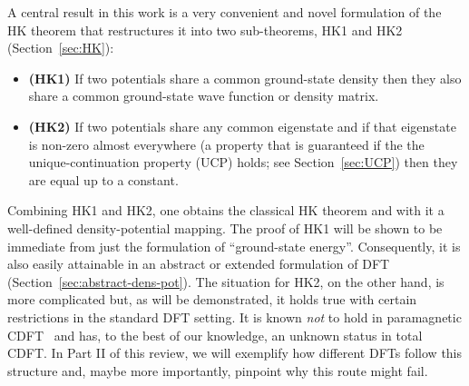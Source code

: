 \documentclass[journal=apcach,manuscript=article,layout=twocolumn]{achemso}
\newcommand{\changed}[1] {{ {#1}}} %
\begin{document}
A central result in this work is a very convenient and novel formulation of the \changed{HK} theorem that restructures it into two sub-theorems, HK1 and HK2 (Section~\ref{sec:HK}):
%
\begin{itemize}
\item \textbf{(HK1)} If two potentials share a common ground-state density then they also share a common ground-state wave function or density matrix.
\item \textbf{(HK2)} If two potentials share any common eigenstate and if that eigenstate is non-zero almost everywhere (a property that is guaranteed if the the unique-continuation property (UCP) holds; see Section~\ref{sec:UCP}) then they are equal up to a constant.
\end{itemize}
%
Combining HK1 and HK2, one obtains the classical \changed{HK} theorem and with it a well-defined density-potential mapping. The proof of HK1 will be shown to be immediate from just the formulation of ``ground-state energy''. Consequently, it is also easily attainable in an abstract or extended formulation of DFT (Section~\ref{sec:abstract-dens-pot}). The situation for HK2, on the other hand, is more complicated but, as will be demonstrated, it holds true with certain restrictions in the standard DFT setting. It is known \emph{not} to hold in paramagnetic CDFT~\cite{Capelle2002} and has, to the best of our knowledge, an unknown status in total CDFT.
In Part II of this review, we will exemplify how different DFTs follow this structure and, maybe more importantly, pinpoint why this route might fail.

\end{document}
